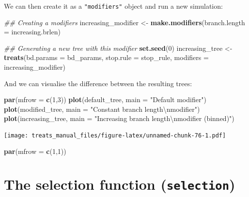 \documentclass[
]{book}
\newenvironment{Shaded}{\begin{snugshade}}{\end{snugshade}}
\newcommand{\CharTok}[1]{\textcolor[rgb]{0.31,0.60,0.02}{#1}}
\newcommand{\CommentTok}[1]{\textcolor[rgb]{0.56,0.35,0.01}{\textit{#1}}}
\newcommand{\DataTypeTok}[1]{\textcolor[rgb]{0.13,0.29,0.53}{#1}}
\newcommand{\DecValTok}[1]{\textcolor[rgb]{0.00,0.00,0.81}{#1}}
\newcommand{\KeywordTok}[1]{\textcolor[rgb]{0.13,0.29,0.53}{\textbf{#1}}}
\newcommand{\NormalTok}[1]{#1}
\newcommand{\StringTok}[1]{\textcolor[rgb]{0.31,0.60,0.02}{#1}}
\begin{document}
We can then create it as a \texttt{"modifiers"} object and run a new simulation:

\begin{Shaded}
\begin{Highlighting}[]
\CommentTok{\#\# Creating a modifiers}
\NormalTok{increasing\_modifier \textless{}{-}}\StringTok{ }\KeywordTok{make.modifiers}\NormalTok{(}\DataTypeTok{branch.length =}\NormalTok{ increasing.brlen)}

\CommentTok{\#\# Generating a new tree with this modifier}
\KeywordTok{set.seed}\NormalTok{(}\DecValTok{0}\NormalTok{)}
\NormalTok{increasing\_tree \textless{}{-}}\StringTok{ }\KeywordTok{treats}\NormalTok{(}\DataTypeTok{bd.params =}\NormalTok{ bd\_params,}
                        \DataTypeTok{stop.rule =}\NormalTok{ stop\_rule,}
                        \DataTypeTok{modifiers =}\NormalTok{ increasing\_modifier)}
\end{Highlighting}
\end{Shaded}

And we can visualise the difference between the resulting trees:

\begin{Shaded}
\begin{Highlighting}[]
\KeywordTok{par}\NormalTok{(}\DataTypeTok{mfrow =} \KeywordTok{c}\NormalTok{(}\DecValTok{1}\NormalTok{,}\DecValTok{3}\NormalTok{))}
\KeywordTok{plot}\NormalTok{(default\_tree,    }\DataTypeTok{main =} \StringTok{"Default modifier"}\NormalTok{)}
\KeywordTok{plot}\NormalTok{(modified\_tree,   }\DataTypeTok{main =} \StringTok{"Constant branch length}\CharTok{\textbackslash{}n}\StringTok{modifier"}\NormalTok{)}
\KeywordTok{plot}\NormalTok{(increasing\_tree, }\DataTypeTok{main =} \StringTok{"Increasing branch length}\CharTok{\textbackslash{}n}\StringTok{modifier (binned)"}\NormalTok{)}
\end{Highlighting}
\end{Shaded}

\texttt{[image: treats\_manual\_files/figure-latex/unnamed-chunk-76-1.pdf]}

\begin{Shaded}
\begin{Highlighting}[]
\KeywordTok{par}\NormalTok{(}\DataTypeTok{mfrow =} \KeywordTok{c}\NormalTok{(}\DecValTok{1}\NormalTok{,}\DecValTok{1}\NormalTok{))}
\end{Highlighting}
\end{Shaded}

\hypertarget{the-selection-function-selection}{%
\section{\texorpdfstring{The selection function (\texttt{selection})}{The selection function (selection)}}\label{the-selection-function-selection}}
\end{document}
